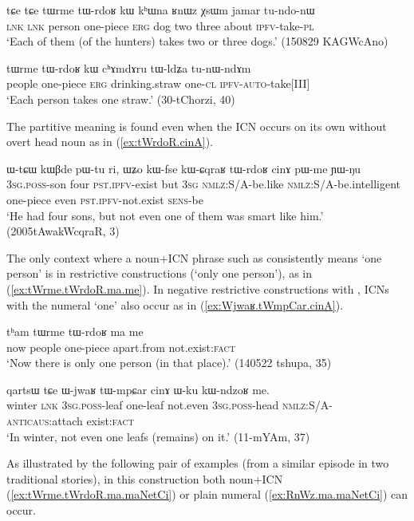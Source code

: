 \begin{exe}
\ex \label{ex:tWrme.tWrdoR.kW}
\gll  tɕe tɕe tɯrme tɯ-rdoʁ kɯ kʰɯna ʁnɯz χsɯm jamar tu-ndo-nɯ \\
\textsc{lnk} \textsc{lnk}  person one-piece \textsc{erg} dog two three about \textsc{ipfv}-take-\textsc{pl} \\
\glt `Each of them (of the hunters) takes two or three dogs.' (150829 KAGWcAno)
\end{exe} 

\begin{exe}
\ex \label{ex:tWrme.tWrdoR2}
\gll tɯrme tɯ-rdoʁ kɯ cʰɤmdɤru tɯ-ldʑa tu-nɯ-ndɤm  \\
people one-piece \textsc{erg} drinking.straw one-\textsc{cl} \textsc{ipfv-auto}-take[III] \\
\glt `Each person takes one straw.' (30-tChorzi, 40)
\end{exe}

The partitive meaning is found even when the ICN occurs on its own without overt head noun as in (\ref{ex:tWrdoR.cinA}).

\begin{exe}
\ex \label{ex:tWrdoR.cinA}
\gll ɯ-tɕɯ kɯβde pɯ-tu ri, ɯʑo kɯ-fse kɯ-ɕqraʁ tɯ-rdoʁ cinɤ pɯ-me ɲɯ-ŋu 	\\
\textsc{3sg.poss}-son four \textsc{pst.ipfv}-exist but \textsc{3sg} \textsc{nmlz}:S/A-be.like \textsc{nmlz}:S/A-be.intelligent one-piece even \textsc{pst.ipfv}-not.exist \textsc{sens}-be \\
\glt `He had four sons, but not even one of them was smart like him.' (2005tAwakWcqraR, 3)
\end{exe} 

The only context where a noun+ICN phrase such as  consistently means `one person' is in restrictive constructions (`only one person'), as in (\ref{ex:tWrme.tWrdoR.ma.me}).  In negative restrictive constructions with , ICNs with the numeral  `one' also occur as in (\ref{ex:Wjwaʁ.tWmpCar.cinA}).

\begin{exe}
\ex \label{ex:tWrme.tWrdoR.ma.me}
\gll tʰam tɯrme tɯ-rdoʁ ma me \\
now people one-piece apart.from not.exist:\textsc{fact} \\
\glt `Now there is only one person (in that place).' (140522 tshupa, 35)
\end{exe} 

\begin{exe}
\ex \label{ex:Wjwaʁ.tWmpCar.cinA}
\gll   qartsɯ tɕe ɯ-jwaʁ tɯ-mpɕar cinɤ ɯ-ku kɯ-ndzoʁ me.  \\
winter \textsc{lnk} \textsc{3sg}.\textsc{poss}-leaf one-leaf not.even \textsc{3sg}.\textsc{poss}-head \textsc{nmlz}:S/A-\textsc{anticaus}:attach exist:\textsc{fact} \\ 
\glt `In winter, not even one leafs (remains) on it.' (11-mYAm, 37)
\end{exe} 
As illustrated by the following pair of examples (from a similar episode in two traditional stories), in this construction both noun+ICN  (\ref{ex:tWrme.tWrdoR.ma.maNetCi})  or plain numeral (\ref{ex:RnWz.ma.maNetCi}) can occur.

